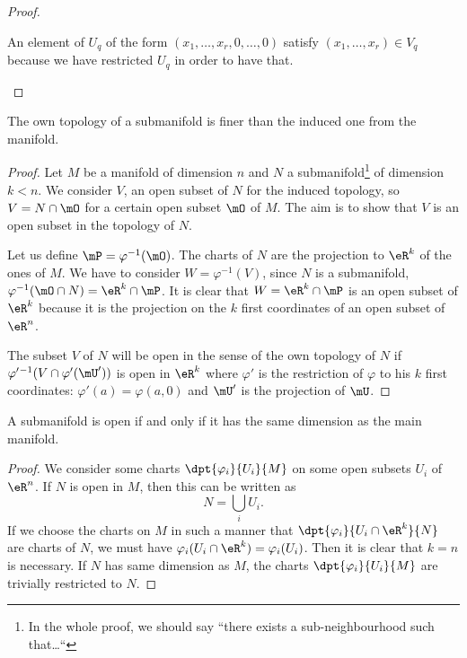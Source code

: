 \begin{proof}
\begin{subproof}
		An element of \( U_q\) of the form \( (x_1,\ldots,x_r,0,\ldots,0)\) satisfy \( (x_1,\ldots,x_r)\in V_q\) because we have restricted \( U_q\) in order to have that.
	\end{subproof}
\end{proof}

\begin{proposition}\label{prop:topo_sub_manif}
	The own topology of a submanifold is finer than the induced one from the manifold.
\end{proposition}

\begin{proof}
	Let $M$ be a manifold of dimension $n$ and $N$ a submanifold\footnote{In the whole proof, we should say ``there exists a sub-neighbourhood such that\ldots``} of dimension $k<n$. We consider $V$, an open subset of $N$ for the induced topology, so $V=N\cap\mO$ for a certain open subset $\mO$ of $M$. The aim is to show that $V$ is an open subset in the topology of $N$.

	Let us define $\mP=\varphi^{-1}(\mO)$.  The charts of $N$ are the projection to $\eR^k$ of the ones of $M$. We have to consider $W=\varphi^{-1}(V)$, since $N$ is a submanifold, $\varphi^{-1}(\mO\cap N)=\eR^k\cap\mP$. It is clear that $W=\eR^k\cap\mP$ is an open subset of $\eR^k$ because it is the projection on the $k$ first coordinates of an open subset of $\eR^n$.

	The subset $V$ of $N$ will be open in the sense of the own topology of $N$ if $\varphi'{}^{-1}(V\cap\varphi'(\mU'))$ is open in $\eR^k$ where $\varphi'$ is the restriction of $\varphi$ to his $k$ first coordinates: $\varphi'(a)=\varphi(a,0)$ and $\mU'$ is the projection of $\mU$.
\end{proof}


\begin{proposition}\label{prop:subvar_ouvert}
	A submanifold is open if and only if it has the same dimension as the main manifold.
\end{proposition}

\begin{proof}
	We consider some charts $\dpt{\varphi_i}{U_i}{M}$ on some open subsets $U_i$ of $\eR^n$. If $N$ is open in $M$, then this can be written as
	\[
		N=\bigcup_iU_i.
	\]
	If we choose the charts on $M$ in such a manner that $\dpt{\varphi_i}{U_i\cap \eR^k}{N}$ are charts of $N$, we must have $\varphi_i(U_i\cap\eR^k)=\varphi_i(U_i)$. Then it is clear that $k=n$ is necessary.
	If $N$ has same dimension as $M$, the charts $\dpt{\varphi_i}{U_i}{M}$ are trivially restricted to $N$.
\end{proof}


